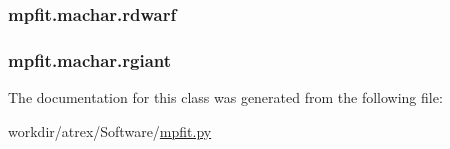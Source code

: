 \hypertarget{classmpfit_1_1machar_ae0d8c6eebbf9deca09bcbc893d5e0428}{
\subsubsection[{rdwarf}]{\setlength{\rightskip}{0pt plus 5cm}mpfit.\-machar.\-rdwarf}}\label{classmpfit_1_1machar_ae0d8c6eebbf9deca09bcbc893d5e0428}
\hypertarget{classmpfit_1_1machar_ab78cc8c341cd8a39922aa13341be9df9}{
\subsubsection[{rgiant}]{\setlength{\rightskip}{0pt plus 5cm}mpfit.\-machar.\-rgiant}}\label{classmpfit_1_1machar_ab78cc8c341cd8a39922aa13341be9df9}


The documentation for this class was generated from the following file\-:\begin{DoxyCompactItemize}
\item 
workdir/atrex/\-Software/\hyperlink{mpfit_8py}{mpfit.\-py}\end{DoxyCompactItemize}
